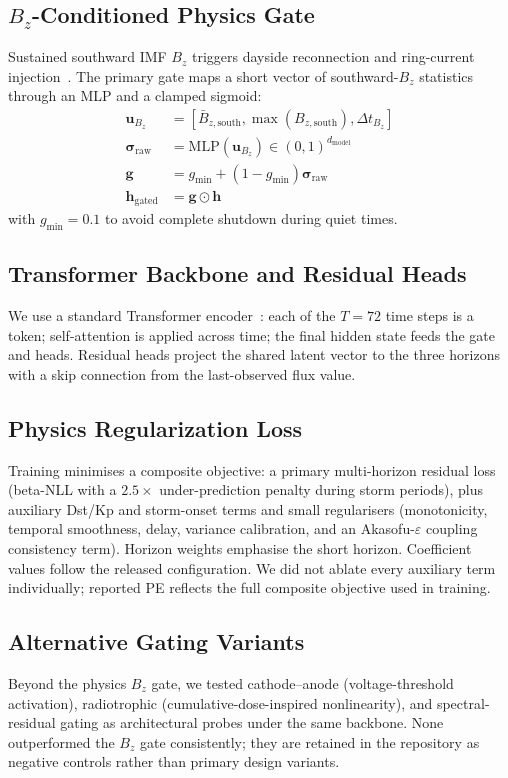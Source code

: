 ﻿\documentclass{ieeeaccess}
\begin{document}
\subsection{\(B_z\)-Conditioned Physics Gate}
Sustained southward IMF \(B_z\) triggers dayside reconnection and ring-current
injection~\cite{b2}. The primary gate maps a short vector of southward-\(B_z\)
statistics through an MLP and a clamped sigmoid:
\begin{align}
\mathbf{u}_{B_z} &= [\bar{B}_{z,\mathrm{south}}, \max(B_{z,\mathrm{south}}), \Delta t_{B_z}] \\
\boldsymbol{\sigma}_{\mathrm{raw}} &= \mathrm{MLP}(\mathbf{u}_{B_z})\in(0,1)^{d_{\mathrm{model}}} \\
\mathbf{g} &= g_{\mathrm{min}} + (1 - g_{\mathrm{min}})\boldsymbol{\sigma}_{\mathrm{raw}} \\
\mathbf{h}_{\mathrm{gated}} &= \mathbf{g} \odot \mathbf{h}
\label{eq:gate_clamp}
\end{align}
with \(g_{\mathrm{min}}=0.1\) to avoid complete shutdown during quiet times.

\subsection{Transformer Backbone and Residual Heads}
We use a standard Transformer encoder~\cite{b13}: each of the \(T=72\) time steps
is a token; self-attention is applied across time; the final hidden state feeds the
gate and heads. Residual heads project the shared latent vector to the three
horizons with a skip connection from the last-observed flux value.

\subsection{Physics Regularization Loss}
Training minimises a composite objective: a primary multi-horizon residual loss (beta-NLL with a \(2.5\times\) under-prediction penalty during storm periods), plus auxiliary Dst/Kp and storm-onset terms and small regularisers (monotonicity, temporal smoothness, delay, variance calibration, and an Akasofu-\(\varepsilon\) coupling consistency term). Horizon weights emphasise the short horizon. Coefficient values follow the released configuration. We did not ablate every auxiliary term individually; reported PE reflects the full composite objective used in training.

\subsection{Alternative Gating Variants}
Beyond the physics \(B_z\) gate, we tested cathode--anode
(voltage-threshold activation), radiotrophic (cumulative-dose-inspired
nonlinearity), and spectral-residual gating as architectural probes under
the same backbone. None outperformed the \(B_z\) gate consistently; they
are retained in the repository as negative controls rather than primary
design variants.
\end{document}
